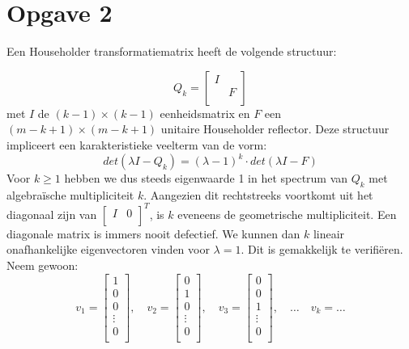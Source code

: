 \documentclass[a4paper]{article}
\newcommand{\opgave}[1]{\section*{Opgave #1}}
\begin{document}
\pagebreak

\opgave{2}

Een Householder transformatiematrix heeft de volgende structuur:

\begin{equation}
		Q_k = \begin{bmatrix}
		I &  \\
  		  & F   \\
		\end{bmatrix} 
\end{equation}
met $I$ de $(k-1) \times (k-1)$ eenheidsmatrix en $F$ een $(m-k+1) \times (m-k+1)$ unitaire Householder reflector.
Deze structuur impliceert een karakteristieke veelterm van de vorm:
\begin{equation}
		det(\lambda I - Q_k) = (\lambda-1)^k \cdot det(\lambda I-F)
\end{equation}
Voor $k \geq 1$ hebben we dus steeds eigenwaarde 1 in het spectrum van $Q_k$ met algebraïsche multipliciteit $k$. 
Aangezien dit rechtstreeks voortkomt uit het diagonaal zijn van $\begin{bmatrix} I & 0\\ \end{bmatrix}^T$, is $k$ eveneens de geometrische multipliciteit. 
Een diagonale matrix is immers nooit defectief.
We kunnen dan $k$ lineair onafhankelijke eigenvectoren vinden voor $\lambda = 1$.
Dit is gemakkelijk te verifiëren.
Neem gewoon:
\begin{equation}
	v_1 = \begin{bmatrix}
		   1  \\
  		   0  \\
  		   0  \\
  		   \vdots  \\
  		   0  \\
		  \end{bmatrix}, \quad
  	v_2 = \begin{bmatrix}
		   0  \\
  		   1  \\
  		   0  \\
  		   \vdots  \\
  		   0  \\
		  \end{bmatrix}, \quad
	v_3 = \begin{bmatrix}
		   0  \\
  		   0  \\
  		   1  \\
  		   \vdots  \\
  		   0  \\
		  \end{bmatrix}, \quad  \dots \quad
	v_k = \dots
\end{equation}
\end{document}
